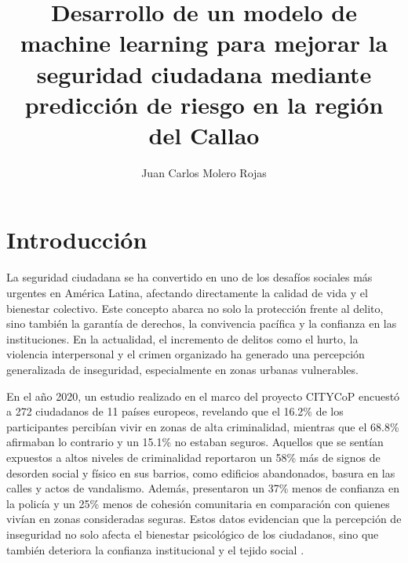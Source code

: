 \documentclass[runningheads]{llncs}
\begin{document}
\title{Desarrollo de un modelo de machine learning para mejorar la seguridad
ciudadana mediante predicción de riesgo en la región del Callao}

\author{Juan Carlos Molero Rojas}


\maketitle

\begin{abstract}
\end{abstract}

\section{Introducción}

La seguridad ciudadana se ha convertido en uno de los desafíos sociales más
urgentes en América Latina, afectando directamente la calidad de vida y el
bienestar colectivo. Este concepto abarca no solo la protección frente al
delito, sino también la garantía de derechos, la convivencia pacífica y la
confianza en las instituciones. En la actualidad, el incremento de delitos como
el hurto, la violencia interpersonal y el crimen organizado ha generado una
percepción generalizada de inseguridad, especialmente en zonas urbanas
vulnerables.

En el año 2020, un estudio realizado en el marco del proyecto CITYCoP encuestó a
272 ciudadanos de 11 países europeos, revelando que el 16.2\% de los
participantes percibían vivir en zonas de alta criminalidad, mientras que el
68.8\% afirmaban lo contrario y un 15.1\% no estaban seguros. Aquellos que se
sentían expuestos a altos niveles de criminalidad reportaron un 58\% más de
signos de desorden social y físico en sus barrios, como edificios abandonados,
basura en las calles y actos de vandalismo. Además, presentaron un 37\% menos de
confianza en la policía y un 25\% menos de cohesión comunitaria en comparación
con quienes vivían en zonas consideradas seguras. Estos datos evidencian que la
percepción de inseguridad no solo afecta el bienestar psicológico de los
ciudadanos, sino que también deteriora la confianza institucional y el tejido
social \cite{reid2020}.
\end{document}

